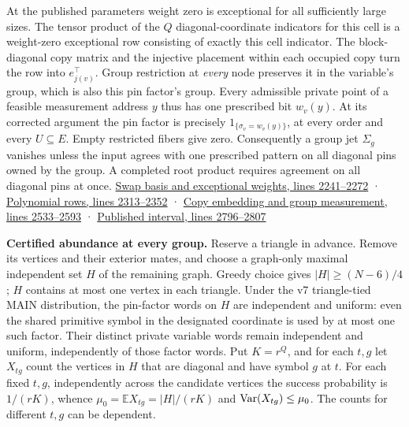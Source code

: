 \documentclass[11pt,a4paper]{article}
\begin{document}
At the published parameters weight zero is exceptional for all
sufficiently large sizes. The tensor product of the \(Q\)
diagonal-coordinate indicators for this cell is a weight-zero
exceptional row consisting of exactly this cell indicator. The
block-diagonal copy matrix and the injective placement within each
occupied copy turn the row into \(e_{j(v)}^\top\). Group restriction at
\emph{every} node preserves it in the variable's group, which is also
this pin factor's group. Every admissible private point of a feasible
measurement address \(y\) thus has one prescribed bit \(w_v(y)\). At its
corrected argument the pin factor is precisely
\(1_{\{\sigma_v=w_v(y)\}}\), at every order and every \(U\subseteq E\).
Empty restricted fibers give zero. Consequently a group jet \(\Sigma_g\)
vanishes unless the input agrees with one prescribed pattern on all
diagonal pins owned by the group. A completed root product requires
agreement on all diagonal pins at once.
\href{https://github.com/openai/math/blob/main/preprints/The-Exponential-Time-Hypothesis-is-False-October-25-2026/build/main_full_version.tex\#L2241}{Swap
basis and exceptional weights, lines 2241--2272} ·
\href{https://github.com/openai/math/blob/main/preprints/The-Exponential-Time-Hypothesis-is-False-October-25-2026/build/main_full_version.tex\#L2313}{Polynomial
rows, lines 2313--2352} ·
\href{https://github.com/openai/math/blob/main/preprints/The-Exponential-Time-Hypothesis-is-False-October-25-2026/build/main_full_version.tex\#L2533}{Copy
embedding and group measurement, lines 2533--2593} ·
\href{https://github.com/openai/math/blob/main/preprints/The-Exponential-Time-Hypothesis-is-False-October-25-2026/build/main_full_version.tex\#L2796}{Published
interval, lines 2796--2807}

\textbf{Certified abundance at every group.} Reserve a triangle in
advance. Remove its vertices and their exterior mates, and choose a
graph-only maximal independent set \(H\) of the remaining graph. Greedy
choice gives \(|H|\ge (N-6)/4\); \(H\) contains at most one vertex in
each triangle. Under the v7 triangle-tied MAIN distribution, the
pin-factor words on \(H\) are independent and uniform: even the shared
primitive symbol in the designated coordinate is used by at most one
such factor. Their distinct private variable words remain independent
and uniform, independently of those factor words. Put \(K=r^Q\), and for
each \(t,g\) let \(X_{tg}\) count the vertices in \(H\) that are
diagonal and have symbol \(g\) at \(t\). For each fixed \(t,g\),
independently across the candidate vertices the success probability is
\(1/(rK)\), whence \(\mu_0=\mathbb E X_{tg}=|H|/(rK)\) and
\({\rm Var}(X_{tg})\le\mu_0\). The counts for different \(t,g\) can be
dependent.
\end{document}
